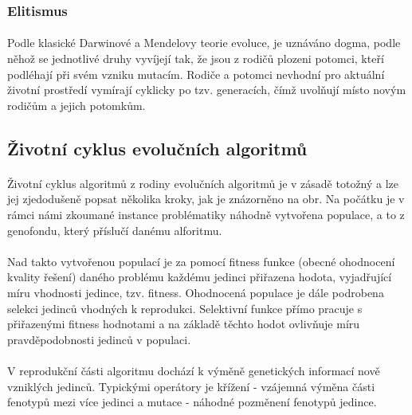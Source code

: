 \documentclass[bc,male,java,dept460]{diploma}		%
\begin{document}
\subsubsection{Elitismus}
\paragraph*{}
Podle klasické Darwinové a Mendelovy teorie evoluce, je uznáváno dogma, podle něhož se jednotlivé druhy vyvíjejí tak, že jsou z rodičů
plozeni potomci, kteří podléhají při svém vzniku mutacím. Rodiče a potomci nevhodní pro aktuální životní prostředí vymírají cyklicky po tzv. generacích, čímž uvolňují místo novým rodičům a jejich potomkům.

\subsection{Životní cyklus evolučních algoritmů}


\paragraph*{}
Životní cyklus algoritmů z rodiny evolučních algoritmů je v zásadě totožný a lze jej zjedodušeně popsat několika kroky, jak je znázorněno na obr. Na počátku je v rámci námi zkoumané instance problématiky náhodně vytvořena populace, a to z genofondu, který příslučí danému alforitmu.

\paragraph*{}
Nad takto vytvořenou populací je za pomocí fitness funkce (obecné ohodnocení kvality řešení) daného problému každému jedinci přiřazena hodota, vyjadřující míru vhodnosti jedince, tzv. fitness. Ohodnocená populace je dále podrobena selekci jedinců vhodných k reprodukci. Selektivní funkce přímo pracuje s přiřazenými fitness hodnotami a na základě těchto hodot ovlivňuje míru pravděpodobnosti jedinců v populaci.

\paragraph*{}
V reprodukční části algoritmu dochází k výměně genetických informací nově vzniklých jedinců. Typickými operátory je křížení - vzájemná výměna části fenotypů mezi více jedinci a mutace - náhodné pozměnení fenotypů jedince.
\end{document}

